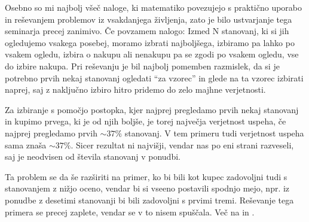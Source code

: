 \documentclass[a4paper, 12pt, titlepage]{article}
\begin{document}
Osebno so mi najbolj všeč naloge, ki matematiko povezujejo s praktično uporabo in reševanjem problemov iz vsakdanjega življenja, zato je bilo ustvarjanje tega seminarja precej zanimivo. Če povzamem nalogo: Izmed N stanovanj, ki si jih ogledujemo vsakega posebej, moramo izbrati najboljšega, izbiramo pa lahko po vsakem ogledu, izbira o nakupu ali nenakupu pa se zgodi po vsakem ogledu, vse do izbire nakupa. Pri reševanju je bil najbolj pomemben razmislek, da si je potrebno prvih nekaj stanovanj ogledati ``za vzorec'' in glede na ta vzorec izbirati naprej, saj z naključno izbiro hitro pridemo do zelo majhne verjetnosti.

Za izbiranje s pomočjo postopka, kjer najprej pregledamo prvih nekaj stanovanj in kupimo prvega, ki je od njih boljše, je torej največja verjetnost uspeha, če najprej pregledamo prvih $\sim 37\%$ stanovanj. V tem primeru tudi verjetnost uspeha sama znaša $\sim 37\%$. Sicer rezultat ni najvišji, vendar nas po eni strani razveseli, saj je neodvisen od števila stanovanj v ponudbi.

Ta problem se da še razširiti na primer, ko bi bili kot kupec zadovoljni tudi s stanovanjem z nižjo oceno, vendar bi si vseeno postavili spodnjo mejo, npr. iz ponudbe z desetimi stanovanji bi bili zadovoljni s prvimi tremi. Reševanje tega primera se precej zaplete, vendar se v to nisem spuščala. Več na \cite{wikipedia_2022} in \cite{jstor_secretary_problem}.

\newpage
\nocite{*}      %
\printbibliography
\end{document}
